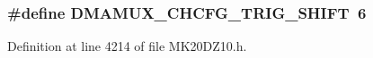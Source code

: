 \subsubsection[{\texorpdfstring{D\+M\+A\+M\+U\+X\+\_\+\+C\+H\+C\+F\+G\+\_\+\+T\+R\+I\+G\+\_\+\+S\+H\+I\+FT}{DMAMUX_CHCFG_TRIG_SHIFT}}]{\setlength{\rightskip}{0pt plus 5cm}\#define D\+M\+A\+M\+U\+X\+\_\+\+C\+H\+C\+F\+G\+\_\+\+T\+R\+I\+G\+\_\+\+S\+H\+I\+FT~6}\hypertarget{group___d_m_a_m_u_x___register___masks_ga714a6b142fde49d701e3f624bb2417e1}{}\label{group___d_m_a_m_u_x___register___masks_ga714a6b142fde49d701e3f624bb2417e1}


Definition at line 4214 of file M\+K20\+D\+Z10.\+h.

